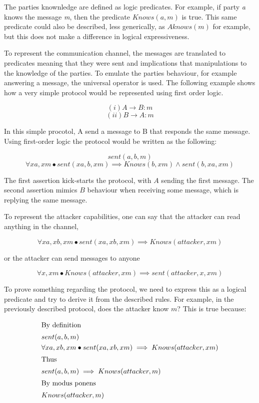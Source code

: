 \documentclass{article}
\begin{document}
	The parties knownledge are defined as logic predicates. For example, if party \emph{a} knows the message
	\emph{m}, then the predicate $Knows(a,m)$ is true. This same predicate could also be described, less 
	generically, as $Aknows(m)$ for example, but this does not make a difference in logical expressiveness.

	To represent the communication channel, the messages are translated to predicates meaning that they were
	sent and implications that manipulations to the knowledge of the parties. To emulate the parties behaviour,
	for example answering a message, the universal operator is used. The following example shows how a very simple
	protocol would be represented using first order logic. 

	$$ (i) A \rightarrow B:m  $$
	$$ (ii) B \rightarrow A:m $$

	In this simple procotol, A send a message to B that responds the same message. Using first-order logic the protocol
	would be written as the following:

	$$ sent(a,b,m) $$
	$$ \forall xa, xm \bullet  sent(xa,b,xm) \implies Knows(b, xm) \land  sent(b, xa, xm)$$

	The first assertion kick-starts the protocol, with $A$ sending the first message. The second assertion mimics $B$ 
	behaviour when receiving some message, which is replying the same message.

	To represent the attacker capabilities, one can say that the attacker can read anything in the channel,
	
	$$ \forall xa, xb, xm \bullet  sent(xa,xb,xm) \implies Knows(attacker, xm) $$

	or the attacker can send messages to anyone
	
	$$ \forall x, xm \bullet  Knows(attacker, xm) \implies sent(attacker, x, xm) $$

	To prove something regarding the protocol, we need to express this as a logical predicate and try to derive it from
	the described rules. For example, in the previously described protocol, does the attacker know $m$? This is true
	because:
		
	\begin{align*}
	\shortintertext{By definition}
	&sent(a,b,m)\\
	&\forall xa, xb, xm \bullet  sent(xa,xb,xm) \implies Knows(attacker, xm)\\
	\shortintertext{Thus}
	&sent(a,b,m) \implies Knows(attacker, m)\\
	\shortintertext{By modus ponens}
	&Knows(attacker, m)\\
	\end{align*}
\end{document}
